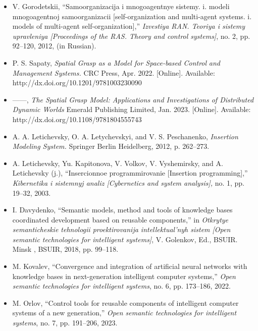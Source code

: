 \begin{multicols}{2}
\begin{itemize}
{proektirovanija intellektual’nyh sistem [Open semantic
technologies for intelligent systems]}, pp. 42–50, 2019.
\renewcommand{\labelitemi}{[17]}
\item
V. Gorodetskii, “Samoorganizacija i mnogoagentnye sistemy. i.
modeli mnogoagentnoj samoorganizacii [self-organization and
multi-agent systems. i. models of multi-agent self-organization],”
\textit{Izvestiya RAN. Teoriya i sistemy upravleniya [Proceedings of the RAS. Theory and control systems]}, no. 2, pp. 92–120, 2012, (in
Russian).
\renewcommand{\labelitemi}{[18]}
\item P. S. Sapaty,\textit{ Spatial Grasp as a Model for Space-based Control}
\newpage
    \textit{and Management Systems.} CRC Press, Apr. 2022. [Online].
Available: http://dx.doi.org/10.1201/9781003230090

\renewcommand{\labelitemi}{[19]}
\item ——,\textit { The Spatial Grasp Model: Applications and
 Investigations of Distributed Dynamic Worlds} Emerald
Publishing Limited, Jan. 2023. [Online]. Available:
http://dx.doi.org/10.1108/9781804555743
\renewcommand{\labelitemi}{[20]}
\item A. A. Letichevsky, O. A. Letychevskyi, and V. S. Peschanenko,
\textit{Insertion Modeling System.} Springer Berlin Heidelberg, 2012, p.
262–273.
\renewcommand{\labelitemi}{[21]}
\item A. Letichevsky, Yu. Kapitonova, V. Volkov, V. Vyshemirsky, and
A. Letichevsky (j.), “Insercionnoe programmirovanie [Insertion
programming],”\textit { Kibernetika i sistemnyj analiz [Cybernetics and
system analysis],} no. 1, pp. 19–32, 2003.
\renewcommand{\labelitemi}{[22]}
\item  I. Davydenko, “Semantic models, method and tools of knowledge bases coordinated development based on reusable components,” in \textit { Otkrytye semanticheskie tehnologii proektirovanija
intellektual’nyh sistem [Open semantic technologies for intelligent
systems]}, V. Golenkov, Ed., BSUIR. Minsk , BSUIR, 2018, pp.
99–118.
\renewcommand{\labelitemi}{[23]}
\item M. Kovalev, “Convergence and integration of artificial neural
networks with knowledge bases in next-generation intelligent
computer systems,”\textit { Open semantic technologies for intelligent
systems}, no. 6, pp. 173–186, 2022.
\renewcommand{\labelitemi}{[24]}
\item
M. Orlov, “Control tools for reusable components of intelligent
computer systems of a new generation,”\textit { Open semantic technologies for intelligent systems}, no. 7, pp. 191–206, 2023.

\end{itemize}
\end{multicols}
